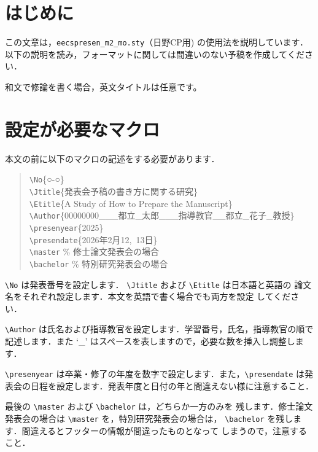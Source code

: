 \documentclass[a4paper]{jarticle}
\begin{document}
\mktitle
%
\renewcommand{\baselinestretch}{1.1}\small
%
\section{はじめに}
この文章は，{\tt eecspresen\_m2\_mo.sty}（日野CP用) の使用法を説明しています．
以下の説明を読み，フォーマットに関しては間違いのない予稿を作成してください．

和文で修論を書く場合，英文タイトルは任意です。

\section{設定が必要なマクロ}

本文の前に以下のマクロの記述をする必要があります．
\newcommand{\tbs}{\textbackslash}
\newcommand{\macrocom}[1]{{\tt \textbackslash#1}}

\begin{quote}
\macrocom{No}\{○-○\}\\
\macrocom{Jtitle}\{発表会予稿の書き方に関する研究\}\\
\macrocom{Etitle}\{A Study of How to Prepare the Manuscript\}\\
\macrocom{Author}\{00000000\_\_\_都立\_太郎\_\_\_指導教官\_\_都立\_花子\_教授\}\\
\macrocom{presenyear}\{2025\}\\
\macrocom{presendate}\{2026年2月12,~13日\}\\%
\macrocom{master}   \% 修士論文発表会の場合\\
\macrocom{bachelor} \% 特別研究発表会の場合
\end{quote}

\macrocom{No} は発表番号を設定します．
\macrocom{Jtitle} および \macrocom{Etitle} は日本語と英語の
論文名をそれぞれ設定します．本文を英語で書く場合でも両方を設定
してください．

\macrocom{Author} は氏名および指導教官を設定します．学習番号，氏名，指導教官の順で
記述します．また `\_' はスペースを表しますので，必要な数を挿入し調整します．

\macrocom{presenyear} は卒業・修了の年度を数字で設定します．また，\macrocom{presendate} 
は発表会の日程を設定します．発表年度と日付の年と間違えない様に注意すること．

最後の \macrocom{master} および \macrocom{bachelor} は，どちらか一方のみを
残します．修士論文発表会の場合は \macrocom{master} を，特別研究発表会の場合は，
\macrocom{bachelor} を残します．間違えるとフッターの情報が間違ったものとなって
しまうので，注意すること．
\end{document}
